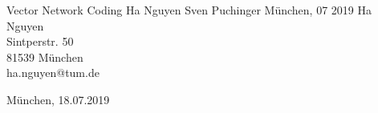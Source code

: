 \documentclass{CODthesis}
\theoremstyle{definition}
\theoremstyle{plain}
\theoremstyle{remark}
\theoremstyle{plain}
\theoremstyle{definition}
\theoremstyle{plain}
\theoremstyle{plain}
\begin{document}
    {Vector Network Coding}                  %
    {Ha Nguyen}                  %
    {Sven Puchinger}            %
    {M\"unchen, 07 2019}          %
    {Ha Nguyen\\                 %
    Sintperstr. 50\\
    81539 M\"unchen\\
    ha.nguyen@tum.de}

    {M\"unchen, 18.07.2019}         %

\cleardoubleemptypage   %


    \setcounter{page}{1}

        \tableofcontents    %
        \listoffigures      %
        \listoftables       %
        \cleardoubleemptypage   %


    \setcounter{page}{1}

	
	
	
    
    
      
       
        
        \cleardoubleemptypage



    \appendix
    \setcounter{page}{1}

        
        
\end{document}
